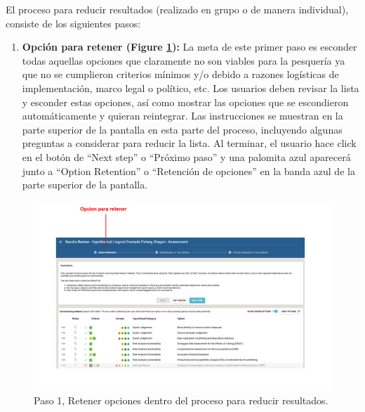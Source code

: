 \documentclass[
  11pt,
]{book}
\providecommand{\tightlist}{%
  \setlength{\itemsep}{0pt}\setlength{\parskip}{0pt}}
\begin{document}
El proceso para reducir resultados (realizado en grupo o de manera individual), consiste de los siguientes pasos:

\begin{enumerate}
\def\labelenumi{\arabic{enumi}.}
\tightlist
\item
  \textbf{Opción para retener (Figure \ref{fig:review-step-1}):} La meta de este primer paso es esconder todas aquellas opciones que claramente no son viables para la pesquería ya que no se cumplieron criterios mínimos y/o debido a razones logísticas de implementación, marco legal o político, etc. Los usuarios deben revisar la lista y esconder estas opciones, así como mostrar las opciones que se escondieron automáticamente y quieran reintegrar. Las instrucciones se muestran en la parte superior de la pantalla en esta parte del proceso, incluyendo algunas preguntas a considerar para reducir la lista. Al terminar, el usuario hace click en el botón de ``Next step'' o ``Próximo paso'' y una palomita azul aparecerá junto a ``Option Retention'' o ``Retención de opciones'' en la banda azul de la parte superior de la pantalla.
\end{enumerate}

\begin{figure}

{\centering \includegraphics[width=0.95\linewidth]{images/review-step-1-es} 

}

\caption{Paso 1, Retener opciones dentro del proceso para reducir resultados.}\label{fig:review-step-1}
\end{figure}
\end{document}
